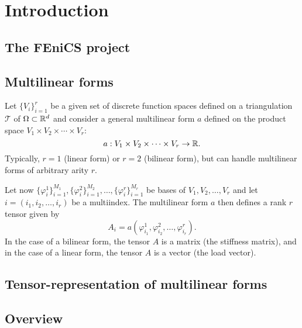 \chapter{Introduction}
\label{sec:introduction}

\section{The FEniCS project}


\section{Multilinear forms}

Let $\{V_i\}_{i=1}^r$ be a given set of discrete function
spaces defined on a triangulation $\mathcal{T}$ of $\Omega \subset
\mathbb{R}^d$ and consider a general multilinear form $a$ defined on the
product space $V_1 \times V_2 \times \cdots \times V_r$:
\begin{equation}
  a : V_1 \times V_2 \times \cdots \times V_r \rightarrow \mathbb{R}.
\end{equation}
Typically, $r = 1$ (linear form) or $r = 2$ (bilinear form), but
\ffc{} can handle multilinear forms of arbitrary arity $r$.

Let now
$\{\varphi_i^1\}_{i=1}^{M_1},
 \{\varphi_i^2\}_{i=1}^{M_2}, \ldots,
 \{\varphi_i^r\}_{i=1}^{M_r}$
be bases of $V_1, V_2, \ldots, V_r$ and let $i = (i_1, i_2, \ldots,
i_r)$ be a multiindex. The multilinear form $a$ then
defines a rank $r$ tensor given by
\begin{equation}
  A_i = a(\varphi_{i_1}^1, \varphi_{i_2}^2, \ldots, \varphi_{i_r}^r).
\end{equation}
In the case of a bilinear form, the tensor $A$ is a matrix (the
stiffness matrix), and in the case of a linear form, the tensor $A$ is
a vector (the load vector).

\section{Tensor-representation of multilinear forms}

\section{Overview}
